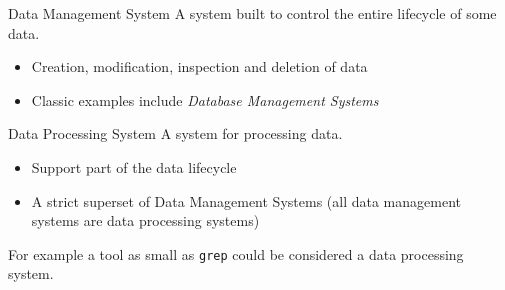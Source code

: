 \begin{tcbraster}[raster columns=2, raster equal height]
    \begin{definitionbox}{Data Management System}
        A system built to control the entire lifecycle of some data.
        \begin{itemize}
            \item Creation, modification, inspection and deletion of data
            \item Classic examples include \textit{Database Management Systems}
        \end{itemize}
    \end{definitionbox}
    \begin{definitionbox}{Data Processing System}
        A system for processing data.
        \begin{itemize}
            \item Support part of the data lifecycle
            \item A strict superset of Data Management Systems (all data management systems are data processing systems)
        \end{itemize}
        For example a tool as small as \texttt{grep} could be considered a data processing system.
    \end{definitionbox}
\end{tcbraster}

